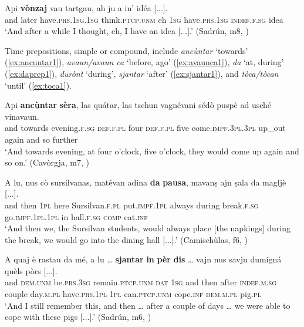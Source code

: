 \ea
\label{ex:vonzaj1}
\gll Api \textbf{vònzaj} vau tartgau, ah ju a in’ idéa [...].   \\
and later have.\textsc{prs.1sg.1sg} think.\textsc{ptcp.unm} eh \textsc{1sg} have.\textsc{prs.1sg} \textsc{indef.f.sg} idea\\
\glt `And after a while I thought, eh, I have an idea [...].' (Sadrún, m8, )
\z

Time prepositions, simple or compound, include \textit{ancùntar} `towards' (\ref{ex:ancuntar1}), \textit{a\-vaun{\slash}avaun ca} `before, ago' (\ref{ex:avaunca1}), \textit{da} `at, during' (\ref{ex:daprep1}), \textit{durònt} `during', \textit{sjantar} `after' (\ref{ex:sjantar1}), and \textit{tòca/tòcan} `until' (\ref{ex:toca1}).

\ea
\label{ex:ancuntar1}
\gll Api \textbf{ancù̱ntar} \textbf{sèra}, las quátar, las tschun vagnévani sédò puspè ad usché vinavaun.\\
and towards evening.\textsc{f.sg} \textsc{def.f.pl} four \textsc{def.f.pl} five come.\textsc{impf.3pl.3pl} up\_out again and so further\\
\glt `And towards evening, at four o'clock, five o'clock, they would come up again and so on.' (Cavòrgja, m7, )
\z

\ea
\label{ex:daprep1}
\gll A lu, nus cò sursilvanas, matévan adina \textbf{da} \textbf{pausa}, mavanṣ ajn ṣala da magljè [...].\\
and then \textsc{1pl} here Sursilvan.\textsc{f.pl} put.\textsc{impf.1pl} always during break.\textsc{f.sg} go.\textsc{impf.1pl.1pl} in hall.\textsc{f.sg} \textsc{comp} eat.\textsc{inf}\\
\glt `And then we, the Sursilvan students, would always place [the napkings] during the break, we would go into the dining hall [...].' (Camischùlas, f6, )
\z

\ea
\label{ex:sjantar1}
\gll    A quaj è rastau da mé, a lu … \textbf{sjantar} \textbf{in} \textbf{pèr} \textbf{dis} … vajn nus savju dumigná quèls pòrs [...].\\
and \textsc{dem.unm} be.\textsc{prs.3sg} remain.\textsc{ptcp.unm}  \textsc{dat}  \textsc{1sg} and then {} after \textsc{indef.m.sg} couple  day.\textsc{m.pl} {} have.\textsc{prs.1pl} \textsc{1pl} can.\textsc{ptcp.unm} cope.\textsc{inf} \textsc{dem.m.pl} pig.\textsc{pl}\\
\glt `And I still remember this, and then … after a couple of days … we were able to cope with these pigs [...].' (Sadrún, m6, )
\z

